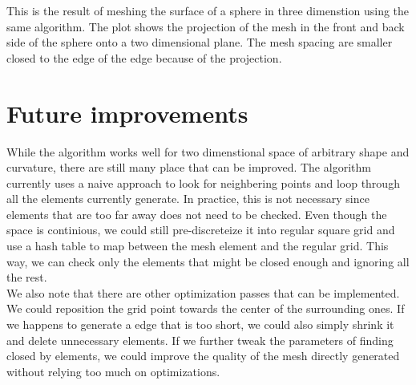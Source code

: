 \documentclass[10pt,fleqn]{article}
\begin{document}
This is the result of meshing the surface of a sphere in three dimenstion using
the same algorithm. The plot shows the projection of the mesh in the front and
back side of the sphere onto a two dimensional plane. The mesh spacing are
smaller closed to the edge of the edge because of the projection.

\section{Future improvements}

While the algorithm works well for two dimenstional space of arbitrary shape and
curvature, there are still many place that can be improved. The algorithm
currently uses a naive approach to look for neighbering points and loop through
all the elements currently generate. In practice, this is not necessary since
elements that are too far away does not need to be checked. Even though the
space is continious, we could still pre-discreteize it into regular square grid
and use a hash table to map between the mesh element and the regular grid. This
way, we can check only the elements that might be closed enough and ignoring all
the rest.\\

We also note that there are other optimization passes that can be implemented.
We could reposition the grid point towards the center of the surrounding ones.
If we happens to generate a edge that is too short, we could also simply shrink
it and delete unnecessary elements. If we further tweak the parameters of
finding closed by elements, we could improve the quality of the mesh directly
generated without relying too much on optimizations.
\end{document}
